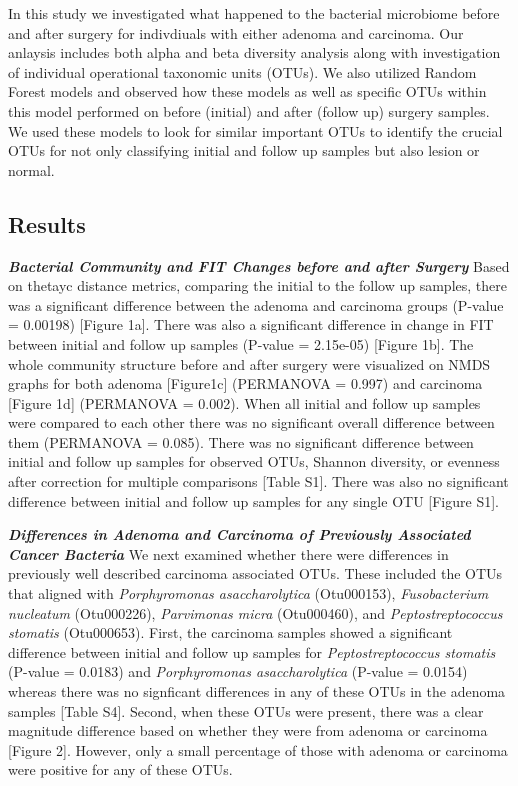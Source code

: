 \documentclass[12pt,]{article}
\begin{document}
In this study we investigated what happened to the bacterial microbiome
before and after surgery for indivdiuals with either adenoma and
carcinoma. Our anlaysis includes both alpha and beta diversity analysis
along with investigation of individual operational taxonomic units
(OTUs). We also utilized Random Forest models and observed how these
models as well as specific OTUs within this model performed on before
(initial) and after (follow up) surgery samples. We used these models to
look for similar important OTUs to identify the crucial OTUs for not
only classifying initial and follow up samples but also lesion or
normal.

\newpage

\subsection{Results}\label{results}

\textbf{\emph{Bacterial Community and FIT Changes before and after
Surgery}} Based on thetayc distance metrics, comparing the initial to
the follow up samples, there was a significant difference between the
adenoma and carcinoma groups (P-value = 0.00198) {[}Figure 1a{]}. There
was also a significant difference in change in FIT between initial and
follow up samples (P-value = 2.15e-05) {[}Figure 1b{]}. The whole
community structure before and after surgery were visualized on NMDS
graphs for both adenoma {[}Figure1c{]} (PERMANOVA = 0.997) and carcinoma
{[}Figure 1d{]} (PERMANOVA = 0.002). When all initial and follow up
samples were compared to each other there was no significant overall
difference between them (PERMANOVA = 0.085). There was no significant
difference between initial and follow up samples for observed OTUs,
Shannon diversity, or evenness after correction for multiple comparisons
{[}Table S1{]}. There was also no significant difference between initial
and follow up samples for any single OTU {[}Figure S1{]}.

\textbf{\emph{Differences in Adenoma and Carcinoma of Previously
Associated Cancer Bacteria}} We next examined whether there were
differences in previously well described carcinoma associated OTUs.
These included the OTUs that aligned with \emph{Porphyromonas
asaccharolytica} (Otu000153), \emph{Fusobacterium nucleatum}
(Otu000226), \emph{Parvimonas micra} (Otu000460), and
\emph{Peptostreptococcus stomatis} (Otu000653). First, the carcinoma
samples showed a significant difference between initial and follow up
samples for \emph{Peptostreptococcus stomatis} (P-value = 0.0183) and
\emph{Porphyromonas asaccharolytica} (P-value = 0.0154) whereas there
was no signficant differences in any of these OTUs in the adenoma
samples {[}Table S4{]}. Second, when these OTUs were present, there was
a clear magnitude difference based on whether they were from adenoma or
carcinoma {[}Figure 2{]}. However, only a small percentage of those with
adenoma or carcinoma were positive for any of these OTUs.
\end{document}
